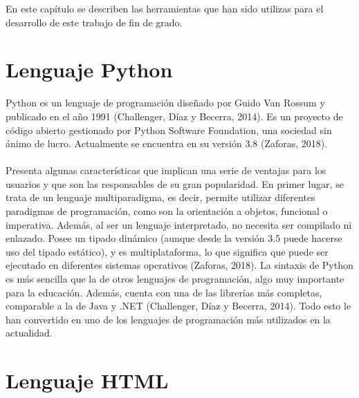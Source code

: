 \documentclass{report}
\begin{document}
En este capítulo se describen las herramientas que han sido utilizas para el desarrollo de este trabajo de fin de grado.

\section{Lenguaje Python}

Python es un lenguaje de programación diseñado por Guido Van Rossum y publicado en el año 1991 (Challenger, Díaz y Becerra, 2014). Es un proyecto de código abierto gestionado por Python Software Foundation, una sociedad sin ánimo de lucro. Actualmente se encuentra en su versión 3.8 (Zaforas, 2018).
\\
\\
Presenta algunas características que implican una serie de ventajas para los usuarios y que son las responsables de su gran popularidad. En primer lugar, se trata de un lenguaje multiparadigma, es decir, permite utilizar diferentes paradigmas de programación, como son la orientación a objetos, funcional o imperativa. Además, al ser un lenguaje interpretado, no necesita ser compilado ni enlazado. Posee un tipado dinámico (aunque desde la versión 3.5 puede hacerse uso del tipado estático), y es multiplataforma, lo que significa que puede ser ejecutado en diferentes sistemas operativos (Zaforas, 2018). La sintaxis de Python es más sencilla que la de otros lenguajes de programación, algo muy importante para la educación. Además, cuenta con una de las librerías más completas, comparable a la de Java y .NET (Challenger, Díaz y Becerra, 2014). Todo esto le han convertido en uno de los lenguajes de programación más utilizados en la actualidad.

\section{Lenguaje HTML}
\end{document}
